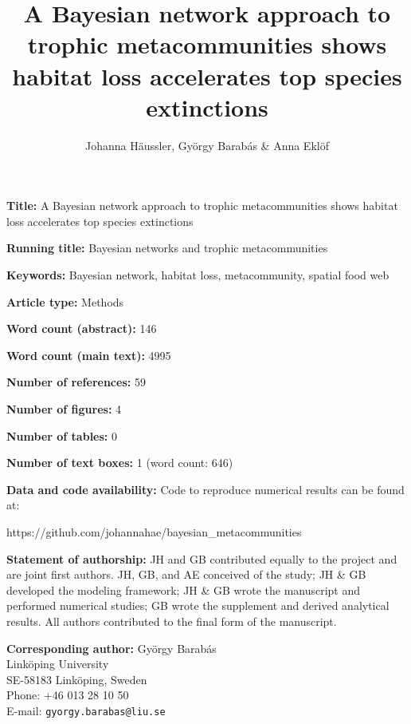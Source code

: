 \documentclass[11pt]{article}
\title{A Bayesian network approach to trophic metacommunities shows habitat loss accelerates top species extinctions}
\author{Johanna H\"aussler, Gy\"orgy Barab\'as \& Anna Ekl\"of}
\date{}
\begin{document}
\maketitle

\doublespacing

\noindent\textbf{Title:} A Bayesian network approach to trophic metacommunities shows habitat loss accelerates top species extinctions

\noindent\textbf{Running title:} Bayesian networks and trophic metacommunities

\noindent\textbf{Keywords:} Bayesian network, habitat loss, metacommunity, spatial food web

\noindent\textbf{Article type:} Methods

\noindent\textbf{Word count (abstract):} 146

\noindent\textbf{Word count (main text):} 4995

\noindent\textbf{Number of references:} 59

\noindent\textbf{Number of figures:} 4

\noindent\textbf{Number of tables:} 0

\noindent\textbf{Number of text boxes:} 1 (word count: 646)

\noindent\textbf{Data and code availability:} Code to reproduce numerical results can be found at:
\begin{verbatim*}
https://github.com/johannahae/bayesian_metacommunities
\end{verbatim*}

\noindent\textbf{Statement of authorship:} JH and GB contributed equally to the project and are joint first authors. JH, GB, and AE conceived of the study; JH \& GB developed the modeling framework; JH \& GB wrote the manuscript and performed numerical studies; GB wrote the supplement and derived analytical results. All authors contributed to the final form of the manuscript.

\noindent\textbf{Corresponding author:} Gy\"orgy Barab\'as\\
\noindent Link\"oping University\\
\noindent SE-58183 Link\"oping, Sweden\\
\noindent Phone: +46 013 28 10 50\\
\noindent E-mail: \texttt{gyorgy.barabas@liu.se}


\linenumbers
\end{document}
